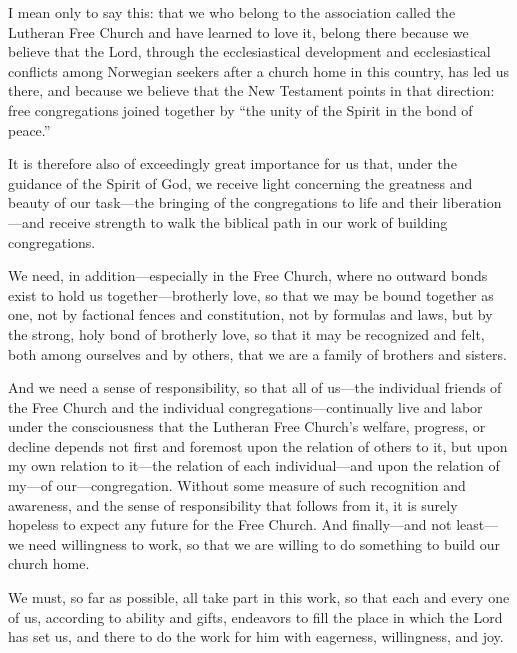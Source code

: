 I mean only to say this: that we who belong to the association called the Lutheran Free Church and have learned to love it, belong there because we believe that the Lord, through the ecclesiastical development and ecclesiastical conflicts among Norwegian seekers after a church home in this country, has led us there, and because we believe that the New Testament points in that direction: free congregations joined together by “the unity of the Spirit in the bond of peace.”

It is therefore also of exceedingly great importance for us that, under the guidance of the Spirit of God, we receive light concerning the greatness and beauty of our task—the bringing of the congregations to life and their liberation—and receive strength to walk the biblical path in our work of building congregations.

We need, in addition—especially in the Free Church, where no outward bonds exist to hold us together—brotherly love, so that we may be bound together as one, not by factional fences and constitution, not by formulas and laws, but by the strong, holy bond of brotherly love, so that it may be recognized and felt, both among ourselves and by others, that we are a family of brothers and sisters.

And we need a sense of responsibility, so that all of us—the individual friends of the Free Church and the individual congregations—continually live and labor under the consciousness that the Lutheran Free Church’s welfare, progress, or decline depends not first and foremost upon the relation of others to it, but upon my own relation to it—the relation of each individual—and upon the relation of my—of our—congregation. Without some measure of such recognition and awareness, and the sense of responsibility that follows from it, it is surely hopeless to expect any future for the Free Church. And finally—and not least—we need willingness to work, so that we are willing to do something to build our church home.

We must, so far as possible, all take part in this work, so that each and every one of us, according to ability and gifts, endeavors to fill the place in which the Lord has set us, and there to do the work for him with eagerness, willingness, and joy.
